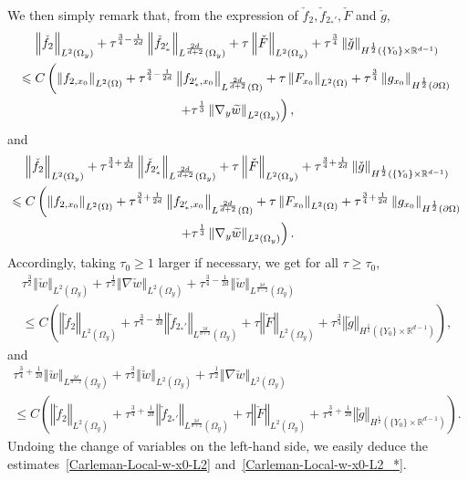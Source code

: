 \documentclass[AHL,Unicode,longabstracts]{cedram}
\newcommand*\R{\mathbb{R}}
\newcommand{\norm}[1]{\left\Vert#1\right\Vert}
\renewcommand{\leq}{\leqslant}
\renewcommand{\geq}{\geqslant}
\renewcommand{\tilde}{\widetilde}
\let\oldtilde\tilde
\renewcommand*{\tilde}[1]{\mathchoice{\widetilde{#1}}{\widetilde{#1}}{\oldtilde{#1}}{\oldtilde{#1}}}
\begin{document}
We then simply remark that, from the expression of $\check f_2, \check f_{2_*'}, \check F$ and $\check g$,
\begin{multline*}
\norm{\check f_2 }_{L^2(\Omega_y)} +
\tau^{\frac{3}{4} -\frac{1}{2d}} \norm{\check f_{2_*'}}_{L^{\frac{2d}{d+2}}(\Omega_y)} +
\tau \norm{\check F}_{L^2(\Omega_y)} +
\tau^{\frac{3}{4}} \norm{\check g}_{H^{\frac{1}{2}}\left(\{Y_0\} \times \R^{d-1}\right)}
\\
\leq C
\left(
\norm{ f_{2,x_0}}_{L^2(\Omega)} +
\tau^{\frac{3}{4}-\frac{1}{2d}} \norm{f_{2_*',x_0}}_{L^{\frac{2d}{d+2}}(\Omega)} +
\tau \norm{F_{x_0}}_{L^2(\Omega)} +
\tau^{\frac{3}{4}} \norm{g_{x_0}}_{H^{\frac{1}{2}}(\partial \Omega)}
\right.\\
\left. +
\tau^{\frac{1}{3}} \norm{\nabla_y \tilde w}_{L^2(\Omega_y)}\right),
\end{multline*}
and
\begin{multline*}
\norm{ \check f_2}_{L^2(\Omega_y)} +
\tau^{\frac{3}{4}+\frac{1}{2d}} \norm{ \check f_{2_*'} }_{L^{\frac{2d}{d+2}}(\Omega_y)} +
\tau \norm{\check F }_{L^2(\Omega_y)} +
\tau^{\frac{3}{4}+\frac{1}{2d}} \norm{\check g}_{H^{\frac{1}{2}}\left(\{Y_0\} \times \R^{d-1}\right)}\\
\leq C
\left(\norm{f_{2,x_0}}_{L^2(\Omega)} +
\tau^{\frac{3}{4}+\frac{1}{2d}} \norm{ f_{2_*',x_0}}_{L^{\frac{2d}{d+2}}(\Omega)} +
\tau \norm{F_{x_0}}_{L^2(\Omega)} +
\tau^{\frac{3}{4}+\frac{1}{2d}} \norm{g_{x_0}}_{H^{\frac{1}{2}}(\partial \Omega)} \right.\\ \left.+
\tau^{\frac{1}{3}} \norm{\nabla_y \tilde w}_{L^2(\Omega_y)}\right).
\end{multline*}
Accordingly, taking $\tau_0\geq 1$ larger if necessary, we get for all $\tau \geq \tau_0$,
\begin{multline*}
\tau^{\frac{3}{2}} \norm{\check w}_{L^2(\Omega_y)} +
\tau^{\frac{1}{2}} \norm{\nabla \check w}_{L^2(\Omega_y)} +
\tau^{\frac{3}{4}- \frac{1}{2d}} \norm{\check w }_{L^{\frac{2d}{d-2}}(\Omega_y)}
\\
\leq C\left(
\norm{ \check f_2 }_{L^2(\Omega_y)} +
\tau^{\frac{3}{4}- \frac{1}{2d}} \norm{\check f_{2_*'} }_{L^{\frac{2d}{d+2}}(\Omega_y)} +
\tau \norm{\check F}_{L^2(\Omega_y)} +
\tau^{\frac{3}{4}} \norm{\check g}_{H^{\frac{1}{2}}\left(\{Y_0\} \times \R^{d-1}\right)}
\right),
\end{multline*}
and
\begin{multline*}
\tau^{\frac{3}{4}+ \frac{1}{2d}} \norm{\check w}_{L^{\frac{2d}{d-2}}(\Omega_y)} +
\tau^{\frac{3}{2}} \norm{\check w}_{L^2(\Omega_y)} +
\tau^{\frac{1}{2}} \norm{\nabla \check w }_{L^2(\Omega_y)}
\\
\leq C\left(
\norm{\check f_2}_{L^2(\Omega_y)} +
\tau^{\frac{3}{4}+ \frac{1}{2d}} \norm{\check f_{2_*'}}_{L^{\frac{2d}{d+2}}(\Omega_y)} +
\tau \norm{\check F}_{L^2(\Omega_y)} +
\tau^{\frac{3}{4}+\frac{1}{2d}} \norm{\check g}_{H^{\frac{1}{2}}\left(\{Y_0\} \times \R^{d-1}\right)}
\right).
\end{multline*}
Undoing the change of variables on the left-hand side, we easily deduce the estimates~\eqref{Carleman-Local-w-x0-L2} and~\eqref{Carleman-Local-w-x0-L2_*}.
\end{document}
